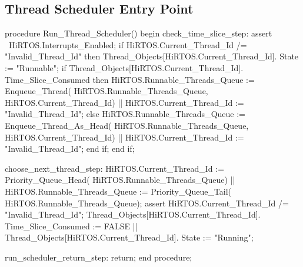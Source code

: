 \documentclass[sigplan,anonymous,10pt]{acmart}
\begin{document}
\subsection{Thread Scheduler Entry Point}
\begin{ppcal}
procedure Run_Thread_Scheduler()
begin
   check_time_slice_step:
   assert ~HiRTOS.Interrupts_Enabled;
   if HiRTOS.Current_Thread_Id /= "Invalid_Thread_Id" 
   then
      Thread_Objects[HiRTOS.Current_Thread_Id].
         State := "Runnable";
      if Thread_Objects[HiRTOS.Current_Thread_Id].
            Time_Slice_Consumed then
         HiRTOS.Runnable_Threads_Queue :=
             Enqueue_Thread(
               HiRTOS.Runnable_Threads_Queue, 
               HiRTOS.Current_Thread_Id) ||
         HiRTOS.Current_Thread_Id := 
            "Invalid_Thread_Id";
      else
         HiRTOS.Runnable_Threads_Queue :=
            Enqueue_Thread_As_Head(
               HiRTOS.Runnable_Threads_Queue,
               HiRTOS.Current_Thread_Id) ||
         HiRTOS.Current_Thread_Id := 
            "Invalid_Thread_Id";
      end if;
   end if;

   choose_next_thread_step:
   HiRTOS.Current_Thread_Id := 
      Priority_Queue_Head(
         HiRTOS.Runnable_Threads_Queue) ||
   HiRTOS.Runnable_Threads_Queue := 
      Priority_Queue_Tail(
         HiRTOS.Runnable_Threads_Queue);
   assert
      HiRTOS.Current_Thread_Id /= "Invalid_Thread_Id";
   Thread_Objects[HiRTOS.Current_Thread_Id].
      Time_Slice_Consumed := FALSE ||
   Thread_Objects[HiRTOS.Current_Thread_Id].
      State := "Running";

   run_scheduler_return_step:
   return;
end procedure;
\end{ppcal}
\end{document}
